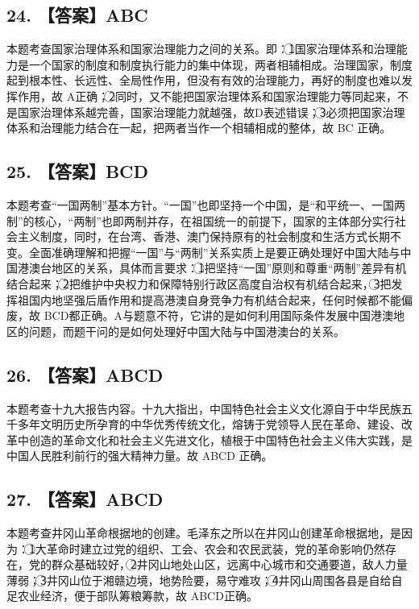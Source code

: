 \documentclass[UTF8,11pt]{ctexart}
\begin{document}
\subsection*{24. 【答案】ABC}

本题考查国家治理体系和国家治理能力之间的关系。即：\textcircled{1}国家治理体系和治理能力是一个国家的制度和制度执行能力的集中体现，两者相辅相成。治理国家，制度起到根本性、长远性、全局性作用，但没有有效的治理能力，再好的制度也难以发挥作用，故 A正确；\textcircled{2}同时，又不能把国家治理体系和国家治理能力等同起来，不是国家治理体系越完善，国家治理能力就越强，故D表述错误；\textcircled{3}必须把国家治理体系和治理能力结合在一起，把两者当作一个相辅相成的整体，故 BC 正确。


\subsection*{25. 【答案】BCD}

本题考查“一国两制”基本方针。“一国”也即坚持一个中国，是“和平统一、一国两制”的核心，“两制”也即两制并存，在祖国统一的前提下，国家的主体部分实行社会主义制度，同时，在台湾、香港、澳门保持原有的社会制度和生活方式长期不变。全面准确理解和把握“一国”与“两制”关系实质上是要正确处理好中国大陆与中国港澳台地区的关系，具体而言要求：\textcircled{1}把坚持“一国”原则和尊重“两制”差异有机结合起来；\textcircled{2}把维护中央权力和保障特别行政区高度自治权有机结合起来，\textcircled{3}把发挥祖国内地坚强后盾作用和提高港澳自身竞争力有机结合起来，任何时候都不能偏废，故 BCD都正确。A与题意不符，它讲的是如何利用国际条件发展中国港澳地区的问题，而题干问的是如何处理好中国大陆与中国港澳台的关系。


\subsection*{26. 【答案】ABCD}

本题考查十九大报告内容。十九大指出，中国特色社会主义文化源自于中华民族五千多年文明历史所孕育的中华优秀传统文化，熔铸于党领导人民在革命、建设、改革中创造的革命文化和社会主义先进文化，植根于中国特色社会主义伟大实践，是中国人民胜利前行的强大精神力量。故 ABCD 正确。


\subsection*{27. 【答案】ABCD}

本题考查井冈山革命根据地的创建。毛泽东之所以在井冈山创建革命根据地，是因为：\textcircled{1}大革命时建立过党的组织、工会、农会和农民武装，党的革命影响仍然存在，党的群众基础较好，\textcircled{2}井冈山地处山区，远离中心城市和交通要道，敌人力量薄弱；\textcircled{3}井冈山位于湘赣边境，地势险要，易守难攻；\textcircled{4}井冈山周围各县是自给自足农业经济，便于部队筹粮筹款，故 ABCD正确。
\end{document}
